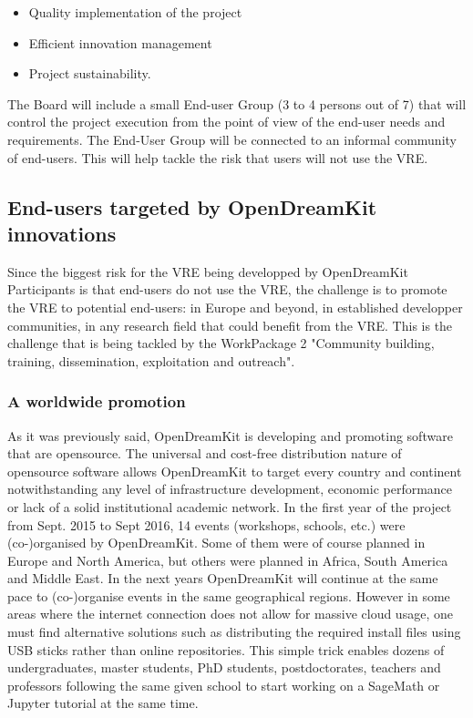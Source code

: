 \documentclass{deliverablereport}
\begin{document}
\begin{itemize}
\item{Quality implementation of the project}
\item{Efficient innovation management}
\item{Project sustainability.}
\end{itemize}

The Board will include a small End-user Group (3 to 4 persons out of 7) that will control the project execution from the point of view of the end-user needs and requirements. The End-User Group will be connected to an informal community of end-users. This will help tackle the risk that users will not use the VRE.

\subsection{End-users targeted by OpenDreamKit innovations}

Since the biggest risk for the VRE being developped by OpenDreamKit Participants is that end-users do not use the VRE, the challenge is to promote the VRE to potential end-users: in Europe and beyond, in established developper communities, in any research field that could benefit from the VRE. This is the challenge that is being tackled by the WorkPackage 2 "Community building, training, dissemination, exploitation and outreach".


\subsubsection{A worldwide promotion}

As it was previously said, OpenDreamKit is developing and promoting software that are opensource. The universal and cost-free distribution nature of opensource software allows OpenDreamKit to target every country and continent notwithstanding any level of infrastructure development, economic performance or lack of a solid institutional academic network.
In the first year of the project from Sept. 2015 to Sept 2016, 14 events (workshops, schools, etc.) were (co-)organised by OpenDreamKit. Some of them were of course planned in Europe and North America, but others were planned in Africa, South America and Middle East. In the next years OpenDreamKit will continue at the same pace to (co-)organise events in the same geographical regions.
However in some areas where the internet connection does not allow for massive cloud usage, one must find alternative solutions such as distributing the required install files using USB sticks  rather than online repositories. This simple trick enables dozens of undergraduates, master students, PhD students, postdoctorates, teachers and professors following the same given school to start working on a SageMath or Jupyter tutorial at the same time.
\end{document}

